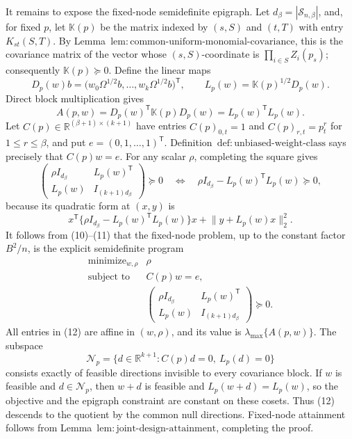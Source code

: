 It remains to expose the fixed-node semidefinite epigraph.  Let \(d_\beta=|\mathcal S_{n,\beta}|\), and, for fixed \(p\), let \(\mathbb K(p)\) be the matrix indexed by \((s,S)\) and \((t,T)\) with entry \(K_{st}(S,T)\).  By Lemma~\(\mathrm{lem{:}common\text{-}uniform\text{-}monomial\text{-}covariance}\), this is the covariance matrix of the vector whose \((s,S)\)-coordinate is \(\prod_{i\in S}Z_i(p_s)\); consequently \(\mathbb K(p)\succeq0\).  Define the linear maps
\[
D_p(w)b=
\bigl(w_0\Omega^{1/2}b,\ldots,w_k\Omega^{1/2}b\bigr)^{\mathsf T},
\qquad
L_p(w)=\mathbb K(p)^{1/2}D_p(w).
\]
Direct block multiplication gives
\[
A(p,w)=D_p(w)^{\mathsf T}\mathbb K(p)D_p(w)
=L_p(w)^{\mathsf T}L_p(w).
\tag{10}
\]
Let \(C(p)\in\mathbb R^{(\beta+1)\times(k+1)}\) have entries \(C(p)_{0,t}=1\) and \(C(p)_{r,t}=p_t^r\) for \(1\le r\le\beta\), and put \(e=(0,1,\ldots,1)^{\mathsf T}\).  Definition~\(\mathrm{def{:}unbiased\text{-}weight\text{-}class}\) says precisely that \(C(p)w=e\).  For any scalar \(\rho\), completing the square gives
\[
\begin{pmatrix}
\rho I_{d_\beta}&L_p(w)^{\mathsf T}\\
L_p(w)&I_{(k+1)d_\beta}
\end{pmatrix}\succeq0
\quad\Longleftrightarrow\quad
\rho I_{d_\beta}-L_p(w)^{\mathsf T}L_p(w)\succeq0,
\tag{11}
\]
because its quadratic form at \((x,y)\) is
\[
x^{\mathsf T}\{\rho I_{d_\beta}-L_p(w)^{\mathsf T}L_p(w)\}x
+\lVert y+L_p(w)x\rVert_2^2.
\]
It follows from (10)--(11) that the fixed-node problem, up to the constant factor \(B^2/n\), is the explicit semidefinite program
\[
\begin{array}{ll}
\operatorname{minimize}_{w,\rho}&\rho\\
\operatorname{subject\ to}&C(p)w=e,\\
&\begin{pmatrix}
\rho I_{d_\beta}&L_p(w)^{\mathsf T}\\
L_p(w)&I_{(k+1)d_\beta}
\end{pmatrix}\succeq0.
\end{array}
\tag{12}
\]
All entries in (12) are affine in \((w,\rho)\), and its value is \(\lambda_{\max}\{A(p,w)\}\).  The subspace
\[
\mathcal N_p=\{d\in\mathbb R^{k+1}:C(p)d=0,\ L_p(d)=0\}
\]
consists exactly of feasible directions invisible to every covariance block.  If \(w\) is feasible and \(d\in\mathcal N_p\), then \(w+d\) is feasible and \(L_p(w+d)=L_p(w)\), so the objective and the epigraph constraint are constant on these cosets.  Thus (12) descends to the quotient by the common null directions.  Fixed-node attainment follows from Lemma~\(\mathrm{lem{:}joint\text{-}design\text{-}attainment}\), completing the proof.